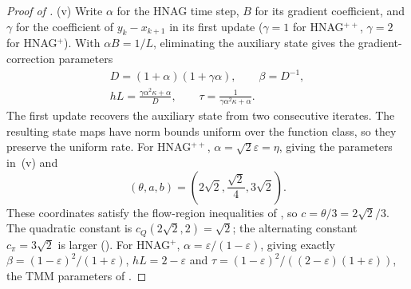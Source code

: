 \documentclass[11pt]{article}
\theoremstyle{definition}
\theoremstyle{remark}
\newcommand{\cQ}{c_{Q}}
\newcommand{\cpi}{c_{\pi}}
\begin{document}
\begin{proof}[Proof of ]
(v) Write \(\alpha\) for the HNAG time step, \(B\) for its gradient coefficient, and \(\gamma\) for the
coefficient of \(y_k-x_{k+1}\) in its first update (\(\gamma=1\) for HNAG\(^{++}\), \(\gamma=2\) for HNAG\(^{+}\)).
With \(\alpha B=1/L\), eliminating the auxiliary state gives the gradient-correction parameters
\[
\begin{gathered}
D=(1+\alpha)(1+\gamma\alpha),\qquad \beta=D^{-1},\\
hL=\frac{\gamma\alpha^2\kappa+\alpha}{D},\qquad
\tau=\frac1{\gamma\alpha^2\kappa+\alpha}.
\end{gathered}
\]
The first update recovers the auxiliary state from two consecutive iterates.
The resulting state maps have norm bounds uniform over the function class, so they preserve the uniform rate.
For HNAG\(^{++}\), \(\alpha=\sqrt2\varepsilon=\eta\), giving the parameters in~(v) and
\[
(\theta,a,b)=\left(2\sqrt2,\frac{\sqrt2}{4},3\sqrt2\right).
\]
These coordinates satisfy the flow-region inequalities of , so \(c=\theta/3=2\sqrt2/3\).
The quadratic constant is \(\cQ(2\sqrt2,2)=\sqrt2\); the alternating constant \(\cpi=3\sqrt2\) is larger
().  For HNAG\(^{+}\), \(\alpha=\varepsilon/(1-\varepsilon)\), giving exactly
\(\beta=(1-\varepsilon)^2/(1+\varepsilon)\), \(hL=2-\varepsilon\) and
\(\tau=(1-\varepsilon)^2/((2-\varepsilon)(1+\varepsilon))\), the TMM parameters of .
\end{proof}
\end{document}

